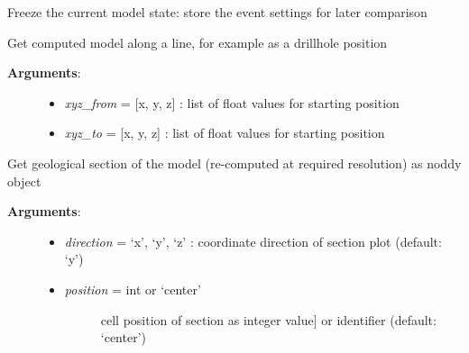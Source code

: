 \documentclass[a4paper,10pt,english]{sphinxmanual}
\begin{document}
\begin{fulllineitems}

\begin{fulllineitems}
\label{pynoddy:pynoddy.experiment.Experiment.freeze}
Freeze the current model state: store the event settings for later comparison

\end{fulllineitems}


\begin{fulllineitems}
\label{pynoddy:pynoddy.experiment.Experiment.get_sampling_line_data}
Get computed model along a line, for example as a drillhole position
\begin{description}
\item[{\textbf{Arguments}:}] \leavevmode\begin{itemize}
\item {} 
\emph{xyz\_from} = {[}x, y, z{]} : list of float values for starting position

\item {} 
\emph{xyz\_to} = {[}x, y, z{]} : list of float values for starting position

\end{itemize}

\end{description}

\end{fulllineitems}


\begin{fulllineitems}
\label{pynoddy:pynoddy.experiment.Experiment.get_section}
Get geological section of the model (re-computed at required resolution) as noddy object
\begin{description}
\item[{\textbf{Arguments}:}] \leavevmode\begin{itemize}
\item {} 
\emph{direction} = `x', `y', `z' : coordinate direction of section plot (default: `y')

\item {} \begin{description}
\item[{\emph{position} = int or `center'}] \leavevmode{[}cell position of section as integer value{]}
or identifier (default: `center')


\end{description}
\end{itemize}
\end{description}
\end{fulllineitems}
\end{fulllineitems}
\end{document}
